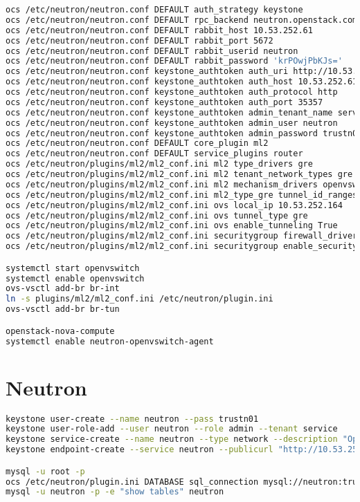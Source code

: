 \documentclass[11pt,letterpaper,oneside]{book}
\begin{document}
\begin{lstlisting}[caption={vircmppaw001},language=bash]
ocs /etc/neutron/neutron.conf DEFAULT auth_strategy keystone
ocs /etc/neutron/neutron.conf DEFAULT rpc_backend neutron.openstack.common.rpc.impl_kombu
ocs /etc/neutron/neutron.conf DEFAULT rabbit_host 10.53.252.61
ocs /etc/neutron/neutron.conf DEFAULT rabbit_port 5672
ocs /etc/neutron/neutron.conf DEFAULT rabbit_userid neutron
ocs /etc/neutron/neutron.conf DEFAULT rabbit_password 'krPOwjPbKJs='
ocs /etc/neutron/neutron.conf keystone_authtoken auth_uri http://10.53.252.61:5000
ocs /etc/neutron/neutron.conf keystone_authtoken auth_host 10.53.252.61
ocs /etc/neutron/neutron.conf keystone_authtoken auth_protocol http
ocs /etc/neutron/neutron.conf keystone_authtoken auth_port 35357
ocs /etc/neutron/neutron.conf keystone_authtoken admin_tenant_name service
ocs /etc/neutron/neutron.conf keystone_authtoken admin_user neutron
ocs /etc/neutron/neutron.conf keystone_authtoken admin_password trustn01
ocs /etc/neutron/neutron.conf DEFAULT core_plugin ml2
ocs /etc/neutron/neutron.conf DEFAULT service_plugins router
ocs /etc/neutron/plugins/ml2/ml2_conf.ini ml2 type_drivers gre
ocs /etc/neutron/plugins/ml2/ml2_conf.ini ml2 tenant_network_types gre
ocs /etc/neutron/plugins/ml2/ml2_conf.ini ml2 mechanism_drivers openvswitch
ocs /etc/neutron/plugins/ml2/ml2_conf.ini ml2_type_gre tunnel_id_ranges 1:1000
ocs /etc/neutron/plugins/ml2/ml2_conf.ini ovs local_ip 10.53.252.164
ocs /etc/neutron/plugins/ml2/ml2_conf.ini ovs tunnel_type gre
ocs /etc/neutron/plugins/ml2/ml2_conf.ini ovs enable_tunneling True
ocs /etc/neutron/plugins/ml2/ml2_conf.ini securitygroup firewall_driver neutron.agent.linux.iptables_firewall.OVSHybridIptablesFirewallDriver
ocs /etc/neutron/plugins/ml2/ml2_conf.ini securitygroup enable_security_group True

systemctl start openvswitch 
systemctl enable openvswitch 
ovs-vsctl add-br br-int
ln -s plugins/ml2/ml2_conf.ini /etc/neutron/plugin.ini 
ovs-vsctl add-br br-tun

openstack-nova-compute 
systemctl enable neutron-openvswitch-agent

\end{lstlisting}

\chapter{Neutron}

\begin{lstlisting}[caption={Neutron virctlpaw001},language=bash]
keystone user-create --name neutron --pass trustn01
keystone user-role-add --user neutron --role admin --tenant service
keystone service-create --name neutron --type network --description "OpenStack Networking Service"
keystone endpoint-create --service neutron --publicurl "http://10.53.252.63:9696" --adminurl "http://10.53.252.63:9696" --internalurl "http://10.53.252.63:9696"

mysql -u root -p
ocs /etc/neutron/plugin.ini DATABASE sql_connection mysql://neutron:trustn01@10.53.252.61/neutron_ml2
mysql -u neutron -p -e "show tables" neutron
\end{lstlisting}
\end{document}
